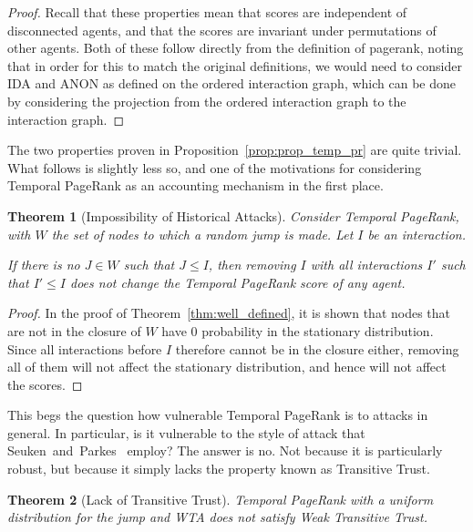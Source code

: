 \documentclass[a4paper,11pt]{book}
\newtheorem{theorem}{Theorem}
\theoremstyle{definition}
\begin{document}
\begin{proof}
    Recall that these properties mean that scores are independent of disconnected agents, and that
    the scores are invariant under permutations of other agents. Both of these follow directly
    from the definition of pagerank, noting that in order for this to match the original definitions,
    we would need to consider IDA and ANON as defined on the ordered interaction graph, which can
    be done by considering the projection from the ordered interaction graph to the interaction graph.
\end{proof}

The two properties proven in Proposition~\ref{prop:prop_temp_pr} are quite trivial. What follows
is slightly less so, and one of the motivations for considering Temporal PageRank as an accounting
mechanism in the first place.

\begin{theorem}[Impossibility of Historical Attacks]
    Consider Temporal PageRank, with $W$ the set of nodes to which a random jump is made. Let
    $I$ be an interaction.

    If there is no $J \in W$ such that $J \leq I$, then removing $I$ with all
    interactions $I'$ such that $I' \leq I$ does not change the Temporal PageRank
    score of any agent.
    \label{}
\end{theorem}

\begin{proof}
    In the proof of Theorem~\ref{thm:well_defined}, it is shown that nodes that are not in the closure
    of $W$ have $0$ probability in the stationary distribution. Since all interactions before $I$ therefore
    cannot be in the closure either, removing all of them will not affect the stationary distribution, and
    hence will not affect the scores.
\end{proof}

This begs the question how vulnerable Temporal PageRank is to attacks in general. In particular, is
it vulnerable to the style of attack that Seuken~and~Parkes~\cite{seuken2014sybil} employ? The
answer is no. Not because it is particularly robust, but because it simply lacks the property
known as Transitive Trust.

\begin{theorem}[Lack of Transitive Trust]
    Temporal PageRank with a uniform distribution for the jump and WTA does not satisfy Weak Transitive Trust.
    \label{thm:no_trans_trust}
\end{theorem}
\end{document}
